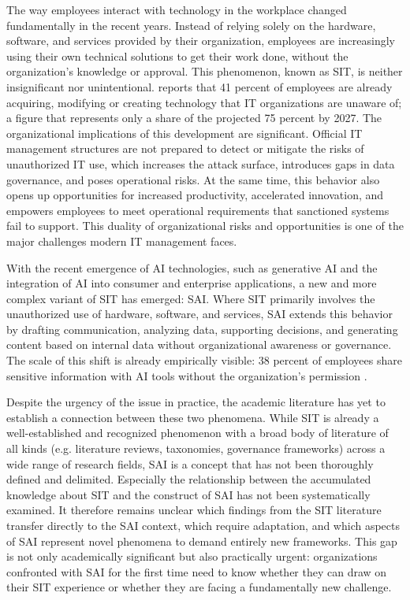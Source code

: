 \documentclass[12pt,oneside]{article}
\begin{document}
The way employees interact with technology in the workplace changed fundamentally in the recent years. Instead of relying solely on the hardware, software, and services provided by their organization, employees are increasingly using their own technical solutions to get their work done, without the organization's knowledge or approval. This phenomenon, known as \ac{SIT}, is neither insignificant nor unintentional. \citet{gartner2023predictions} reports that 41 percent of employees are already acquiring, modifying or creating technology that \ac{IT} organizations are unaware of; a figure that represents only a share of the projected 75 percent by 2027. The organizational implications of this development are significant. Official \ac{IT} management structures are not prepared to detect or mitigate the risks of unauthorized \ac{IT} use, which increases the attack surface, introduces gaps in data governance, and poses operational risks. At the same time, this behavior also opens up opportunities for increased productivity, accelerated innovation, and empowers employees to meet operational requirements that sanctioned systems fail to support. This duality of organizational risks and opportunities is one of the major challenges modern IT management faces.

With the recent emergence of \ac{AI} technologies, such as generative \ac{AI} and the integration of \ac{AI} into consumer and enterprise applications, a new and more complex variant of \ac{SIT} has emerged: \ac{SAI}. Where \ac{SIT} primarily involves the unauthorized use of hardware, software, and services, \ac{SAI} extends this behavior by drafting communication, analyzing data, supporting decisions, and generating content based on internal data without organizational awareness or governance. The scale of this shift is already empirically visible: 38 percent of employees share sensitive information with \ac{AI} tools without the organization's permission \citep{coker2024third}.

Despite the urgency of the issue in practice, the academic literature has yet to establish a connection between these two phenomena. While \ac{SIT} is already a well-established and recognized phenomenon with a broad body of literature of all kinds (e.g. literature reviews, taxonomies, governance frameworks) across a wide range of research fields, \ac{SAI} is a concept that has not been thoroughly defined and delimited. Especially the relationship between the accumulated knowledge about \ac{SIT} and the construct of \ac{SAI} has not been systematically examined. It therefore remains unclear which findings from the \ac{SIT} literature transfer directly to the \ac{SAI} context, which require adaptation, and which aspects of \ac{SAI} represent novel phenomena to demand entirely new frameworks. This gap is not only academically significant but also practically urgent: organizations confronted with \ac{SAI} for the first time need to know whether they can draw on their \ac{SIT} experience or whether they are facing a fundamentally new challenge.
\end{document}
